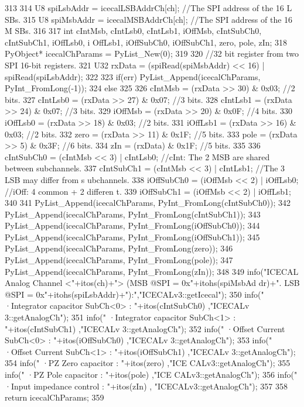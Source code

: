 \begin{DoxyCode}
313 {                            
314     U8 spiLsbAddr = icecalLSBAddrCh[ch];            //The SPI address of the 16 L
      SBs.
315     U8 spiMsbAddr = icecalMSBAddrCh[ch];            //The SPI address of the 16 M
      SBs.
316 
317     int cIntMsb, cIntLsb0, cIntLsb1, iOffMsb, cIntSubCh0, cIntSubCh1, iOffLsb0, i
      OffLsb1, iOffSubCh0, iOffSubCh1, zero, pole, zIn;
318     PyObject* icecalChParams = PyList_New(0);
319 
320     //32 bit register from two SPI 16-bit registers.
321     U32 rxData = (spiRead(spiMsbAddr) << 16) | spiRead(spiLsbAddr);
322 
323     if(err) PyList_Append(icecalChParams, PyInt_FromLong(-1));
324     else
325     {
326         cIntMsb     = (rxData >> 30) & 0x03;        //2 bits.
327         cIntLsb0    = (rxData >> 27) & 0x07;        //3 bits.
328         cIntLsb1    = (rxData >> 24) & 0x07;        //3 bits.
329         iOffMsb     = (rxData >> 20) & 0x0F;        //4 bits.
330         iOffLsb0    = (rxData >> 18) & 0x03;        //2 bits.
331         iOffLsb1    = (rxData >> 16) & 0x03;        //2 bits.
332         zero            = (rxData >> 11) & 0x1F;        //5 bits.
333         pole            = (rxData >> 5)  & 0x3F;        //6 bits.
334         zIn             = (rxData)           & 0x1F;        //5 bits.
335 
336         cIntSubCh0 = (cIntMsb << 3) | cIntLsb0;     //cInt: The 2 MSB are shared 
      between subchannels.
337         cIntSubCh1 = (cIntMsb << 3) | cIntLsb1;     //The 3 LSB may differ from s
      ubchannels.
338         iOffSubCh0 = (iOffMsb << 2) | iOffLsb0;     //iOff: 4 common + 2 differen
      t.
339         iOffSubCh1 = (iOffMsb << 2) | iOffLsb1;
340 
341         PyList_Append(icecalChParams, PyInt_FromLong(cIntSubCh0));
342         PyList_Append(icecalChParams, PyInt_FromLong(cIntSubCh1));
343         PyList_Append(icecalChParams, PyInt_FromLong(iOffSubCh0));
344         PyList_Append(icecalChParams, PyInt_FromLong(iOffSubCh1));
345         PyList_Append(icecalChParams, PyInt_FromLong(zero));
346         PyList_Append(icecalChParams, PyInt_FromLong(pole));
347         PyList_Append(icecalChParams, PyInt_FromLong(zIn));
348 
349         info("ICECAL Analog Channel <"+itos(ch)+"> (MSB @SPI = 0x"+itohs(spiMsbAd
      dr)+". LSB @SPI = 0x"+itohs(spiLsbAddr)+"):","ICECALv3::getIcecal");
350         info("   ·Integrator capacitor SubCh<0> : "+itos(cIntSubCh0)   ,"ICECALv
      3::getAnalogCh");
351         info("   ·Integrator capacitor SubCh<1> : "+itos(cIntSubCh1)   ,"ICECALv
      3::getAnalogCh");
352         info("   ·Offset Current SubCh<0>       : "+itos(iOffSubCh0)   ,"ICECALv
      3::getAnalogCh");
353         info("   ·Offset Current SubCh<1>       : "+itos(iOffSubCh1)   ,"ICECALv
      3::getAnalogCh");
354         info("   ·PZ Zero capacitor             : "+itos(zero)             ,"ICE
      CALv3::getAnalogCh");
355         info("   ·PZ Pole capacitor             : "+itos(pole)             ,"ICE
      CALv3::getAnalogCh");
356         info("   ·Input impedance control       : "+itos(zIn)                  ,
      "ICECALv3::getAnalogCh");
357     }
358     return icecalChParams;
359 }
\end{DoxyCode}
